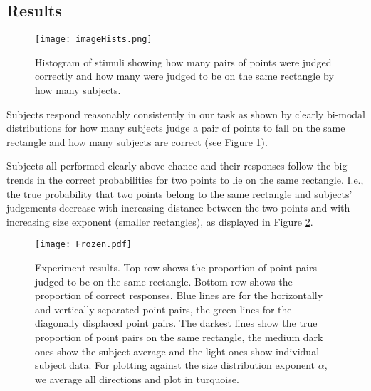 \documentclass[10pt,letterpaper]{article}
\begin{document}
\subsection{Results}

\begin{figure}
\begin{center}
\texttt{[image: imageHists.png]}
\end{center}
\caption{Histogram of stimuli showing how many pairs of points were judged correctly and how many were judged to be on the same rectangle by how many subjects. %
\label{fig:hist}}
\end{figure}

Subjects respond reasonably consistently in our task as shown by clearly bi-modal distributions for how many subjects judge a pair of points to fall on the same rectangle and how many subjects are correct (see Figure \ref{fig:hist}).

Subjects all performed clearly above chance and their responses follow the big trends in the correct probabilities for two points to lie on the same rectangle. I.e., the true probability that two points belong to the same rectangle and subjects' judgements decrease with increasing distance between the two points and with increasing size exponent (smaller rectangles), as displayed in Figure \ref{fig:expResult}. 

\begin{figure}
\begin{center}
\texttt{[image: Frozen.pdf]}
\end{center}
\caption{Experiment results. Top row shows the proportion of point pairs judged to be on the same rectangle. Bottom row shows the proportion of correct responses. Blue lines are for the horizontally and vertically separated point pairs, the green lines for the diagonally displaced point pairs. The darkest lines show the true proportion of point pairs on the same rectangle, the medium dark ones show the subject average and the light ones show individual subject data. For plotting against the size distribution exponent $\alpha$, we average all directions and plot in turquoise.
\label{fig:expResult}}
\end{figure}
\end{document}
